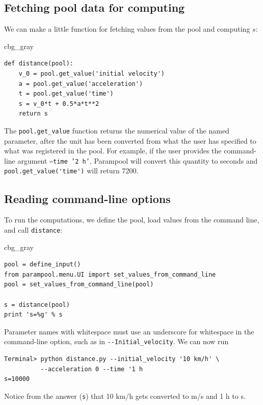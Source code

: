 \documentclass[graybox,envcountchap,sectrefs,final]{svmonodo}
\newenvironment{_cod_tight}[1]{
   \def\FrameCommand{\colorbox{#1}}
   \FrameRule0.6pt\MakeFramed {\FrameRestore}\vskip3mm}
   {\vskip0mm\endMakeFramed}
\newenvironment{cod}[1]{
\bgroup\rmfamily
\fboxsep=0mm\relax
\begin{_cod_tight}{#1}
\list{}{\parsep=-2mm\parskip=0mm\topsep=0pt\leftmargin=2mm
\rightmargin=2\leftmargin\leftmargin=4pt\relax}
\item\relax}
{\endlist\end{_cod_tight}\egroup}
\begin{document}
\subsection{Fetching pool data for computing}

We can make a little function for fetching values from the pool
and computing $s$:

\begin{cod}{cbg_gray}\begin{Verbatim}[numbers=none,fontsize=\fontsize{9pt}{9pt},baselinestretch=0.95,xleftmargin=2mm]
def distance(pool):
    v_0 = pool.get_value('initial velocity')
    a = pool.get_value('acceleration')
    t = pool.get_value('time')
    s = v_0*t + 0.5*a*t**2
    return s
\end{Verbatim}
\end{cod}
\noindent
The \Verb!pool.get_value! function returns the numerical value of
the named parameter, after the unit has been converted from what the
user has specified to what was registered in the pool.
For example, if the user provides the command-line argument
\texttt{--time '2 h'}, Parampool will convert this quantity to seconds and
\Verb!pool.get_value('time')! will return 7200.

\subsection{Reading command-line options}

To run the computations, we define the pool, load values from the
command line, and call \texttt{distance}:

\begin{cod}{cbg_gray}\begin{Verbatim}[numbers=none,fontsize=\fontsize{9pt}{9pt},baselinestretch=0.95,xleftmargin=2mm]
pool = define_input()
from parampool.menu.UI import set_values_from_command_line
pool = set_values_from_command_line(pool)

s = distance(pool)
print 's=%g' % s
\end{Verbatim}
\end{cod}
\noindent

Parameter names with whitespace must use an underscore for whitespace
in the command-line option, such as in \Verb!--Initial_velocity!.
We can now run

\begin{Verbatim}[frame=lines,label=\fbox{{\tiny Terminal}},framesep=2.5mm,framerule=0.7pt,fontsize=\fontsize{9pt}{9pt}]
Terminal> python distance.py --initial_velocity '10 km/h' \ 
          --acceleration 0 --time '1 h
s=10000
\end{Verbatim}
Notice from the answer (\texttt{s}) that 10 km/h gets converted to m/s and 1 h to s.
\end{document}
